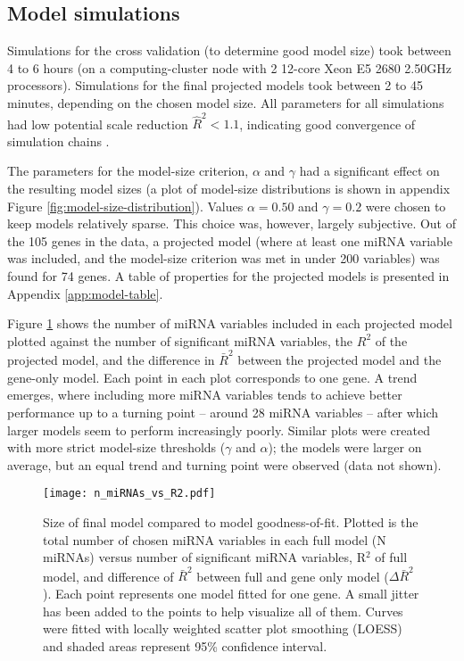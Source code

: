 \subsection{Model simulations}

Simulations for the cross validation (to determine good model size) took
between 4 to 6 hours (on a computing-cluster node with 2 12-core Xeon E5 2680
2.50GHz processors). Simulations for the final projected models took between 2
to 45 minutes, depending on the chosen model size. All parameters for all
simulations had low potential scale reduction $\hat{R}^2 < 1.1$, indicating
good convergence of simulation chains \citep{Gelman2013}.

The parameters for the model-size criterion, $\alpha$ and $\gamma$ had a
significant effect on the resulting model sizes (a plot of model-size
distributions is shown in appendix Figure \ref{fig:model-size-distribution}).
Values $\alpha = 0.50$ and $\gamma = 0.2$ were chosen to keep models
relatively sparse. This choice was, however, largely subjective. Out of the
105 genes in the data, a projected model (where at least one miRNA variable
was included, and the model-size criterion was met in under 200 variables) was
found for 74 genes. A table of properties for the projected models is
presented in Appendix \ref{app:model-table}.

Figure \ref{n-miRNAs-vs-R2} shows the number of miRNA variables included in
each projected model plotted against the number of significant miRNA
variables, the $R^2$ of the projected model, and the difference in $\bar{R}^2$
between the projected model and the gene-only model. Each point in each plot
corresponds to one gene. A trend emerges, where including more
miRNA variables tends to achieve better performance up to a turning point --
around 28 miRNA variables -- after which larger models seem to perform
increasingly poorly. Similar plots were created with more strict model-size
thresholds ($\gamma$ and $\alpha$); the models were larger on
average, but an equal trend and turning point were observed (data not shown).

\begin{figure}[!h]
  \centering
  \texttt{[image: n\_miRNAs\_vs\_R2.pdf]}
  \caption{Size of final model compared to model goodness-of-fit. Plotted is
  the total number of chosen miRNA variables in each full model (N miRNAs)
  versus number of significant miRNA variables, R$^2$ of full model, and
  difference of $\bar{R}^2$ between full and gene only model
  ($\Delta\bar{R}^2$). Each point represents one model fitted for one gene. A
  small jitter has been added to the points to help visualize all of them.
  Curves were fitted with locally weighted scatter plot smoothing (LOESS) and
  shaded areas represent 95\% confidence interval.}
  \label{n-miRNAs-vs-R2}
\end{figure}


